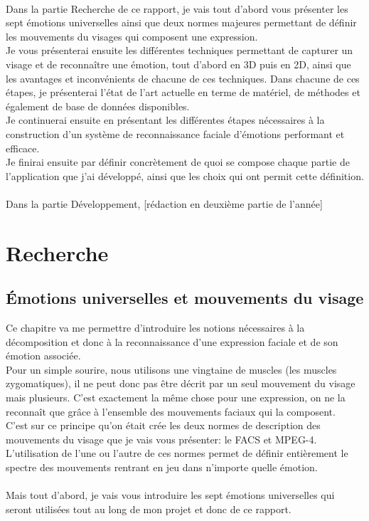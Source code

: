 \documentclass[overfullbox, poster]{polytech/polytech}
\begin{document}
\\
Dans la partie Recherche de ce rapport, je vais tout d'abord vous présenter les sept émotions universelles ainsi que deux normes majeures permettant de définir les mouvements du visages qui composent une expression.\\
Je vous présenterai ensuite les différentes techniques permettant de capturer un visage et de reconnaître une émotion, tout d'abord en 3D puis en 2D, ainsi que les avantages et inconvénients de chacune de ces techniques. Dans chacune de ces étapes, je présenterai l'état de l'art actuelle en terme de matériel, de méthodes et également de base de données disponibles. \\
Je continuerai ensuite en présentant les différentes étapes nécessaires à la construction d'un système de reconnaissance faciale d'émotions performant et efficace.\\
Je finirai ensuite par définir concrètement de quoi se compose chaque partie de l'application que j'ai développé, ainsi que les choix qui ont permit cette définition.\\
\\
Dans la partie Développement, [rédaction en deuxième partie de l'année]


\part{Recherche}
\label{part:part_recherche}

\chapter{Émotions universelles et mouvements du visage}
\label{chap:chap1_1}

Ce chapitre va me permettre d'introduire les notions nécessaires à la décomposition et donc à la reconnaissance d'une expression faciale et de son émotion associée.\\
Pour un simple sourire, nous utilisons une vingtaine de muscles (les muscles zygomatiques), il ne peut donc pas être décrit par un seul mouvement du visage mais plusieurs. C'est exactement la même chose pour une expression, on ne la reconnaît que grâce à l'ensemble des mouvements faciaux qui la composent.\\
C'est sur ce principe qu'on était crée les deux normes de description des mouvements du visage que je vais vous présenter: le FACS et MPEG-4.\\
L'utilisation de l'une ou l'autre de ces normes permet de définir entièrement le spectre des mouvements rentrant en jeu dans n'importe quelle émotion.\\
\\
Mais tout d'abord, je vais vous introduire les sept émotions universelles qui seront utilisées tout au long de mon projet et donc de ce rapport.
\end{document}
